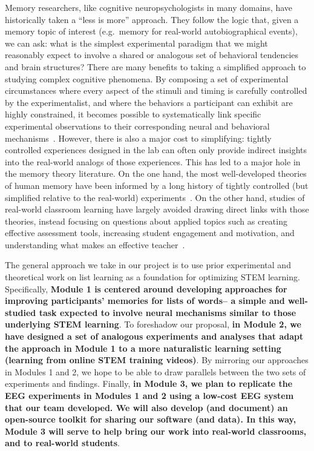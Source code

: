 
Memory researchers, like cognitive neuropsychologists in many domains, have
historically taken a ``less is more'' approach. They follow the logic that,
given a memory topic of interest (e.g.\ memory for real-world autobiographical
events), we can ask: what is the simplest experimental paradigm that we might
reasonably expect to involve a shared or analogous set of behavioral tendencies
and brain structures? There are many benefits to taking a simplified approach
to studying complex cognitive phenomena. By composing a set of experimental
circumstances where every aspect of the stimuli and timing is carefully
controlled by the experimentalist, and where the behaviors a participant can
exhibit are highly constrained, it becomes possible to systematically link
specific experimental observations to their corresponding neural and behavioral
mechanisms~\citep{OReiMuna00}. However, there is also a major cost to
simplifying: tightly controlled experiences designed in the lab can often only
provide indirect insights into the real-world analogs of those experiences.
This has led to a major hole in the memory theory literature. On the one hand,
the most well-developed theories of human memory have been informed by a long
history of tightly controlled (but simplified relative to the real-world)
experiments~\citep[e.g.\ list-learning, priming, reaction times; ][]{Kaha12}.
On the other hand, studies of real-world classroom learning have largely
avoided drawing direct links with those theories, instead focusing on questions
about applied topics such as creating effective assessment tools, increasing
student engagement and motivation, and understanding what makes an effective
teacher~\citep{Seid07}.

The general approach we take in our project is to use prior experimental and
theoretical work on list learning as a foundation for optimizing STEM learning.
Specifically, \textbf{Module 1 is centered around developing approaches for
improving participants' memories for lists of words-- a simple and well-studied
task expected to involve neural mechanisms similar to those underlying STEM
learning}. To foreshadow our proposal, \textbf{in Module 2, we have designed a
set of analogous experiments and analyses that adapt the approach in Module 1
to a more naturalistic learning setting (learning from online STEM training
videos)}. By mirroring our approaches in Modules 1 and 2, we hope to be able to
draw parallels between the two sets of experiments and findings. Finally,
\textbf{in Module 3, we plan to replicate the EEG experiments in Modules 1 and
2 using a low-cost EEG system that our team developed. We will also develop
(and document) an open-source toolkit for sharing our software (and data). In
this way, Module 3 will serve to help bring our work into real-world
classrooms, and to real-world students}.

